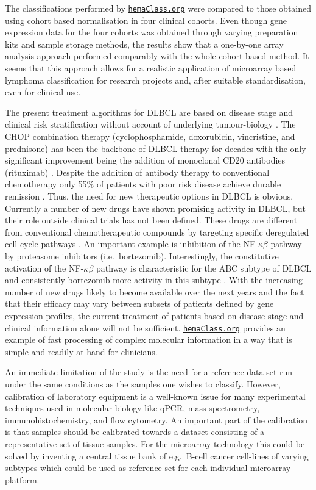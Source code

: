 \documentclass{article}
\newcommand{\hemaClass}{\href{http://hemaClass.org}{\texttt{hemaClass.org}}}
\begin{document}
The classifications performed by \hemaClass{} were compared to those obtained using cohort based normalisation in four clinical cohorts.
Even though gene expression data for the four cohorts was obtained through varying preparation kits and sample storage methods, the results show that a one-by-one array analysis approach performed comparably with the whole cohort based method.
It seems that this approach allows for a realistic application of microarray based lymphoma classification for research projects and, after suitable standardisation, even for clinical use.

The present treatment algorithms for DLBCL are based on disease stage and clinical risk stratification without account of underlying tumour-biology \citep{Schmoll2012}.
The CHOP combination therapy (cyclophosphamide, doxorubicin, vincristine, and prednisone) has been the backbone of DLBCL therapy for decades with the only significant improvement being the addition of monoclonal CD20 antibodies (rituximab) \citep{Coiffier2002a}.
Despite the addition of antibody therapy to conventional chemotherapy only 55\% of patients with poor risk disease achieve durable remission \citep{Ziepert2010}.
Thus, the need for new therapeutic options in DLBCL is obvious.
Currently a number of new drugs have shown promising activity in DLBCL, but their role outside clinical trials has not been defined.
These drugs are different from conventional chemotherapeutic compounds by targeting specific deregulated cell-cycle pathways \citep{Friedberg2011}.
An important example is inhibition of the NF-$\kappa\beta$ pathway by proteasome inhibitors (i.e.\ bortezomib).
Interestingly, the constitutive activation of the NF-$\kappa\beta$ pathway is characteristic for the ABC subtype of DLBCL and consistently bortezomib more activity in this subtype \citep{Nogai2013}.
With the increasing number of new drugs likely to become available over the next years and the fact that their efficacy may vary between subsets of patients defined by gene expression profiles, the current treatment of patients based on disease stage and clinical information alone will not be sufficient.
\hemaClass{} provides an example of fast processing of complex molecular information in a way that is simple and readily at hand for clinicians.

An immediate limitation of the study is the need for a reference data set run under the same conditions as the samples one wishes to classify.
However, calibration of laboratory equipment is a well-known issue for many experimental techniques used in molecular biology like qPCR, mass spectrometry, immunohistochemistry, and flow cytometry.
An important part of the calibration is that samples should be calibrated towards a dataset consisting of a representative set of tissue samples.
For the microarray technology this could be solved by inventing a central tissue bank of e.g.\ B-cell cancer cell-lines of varying subtypes which could be used as reference set for each individual microarray platform.
\end{document}
